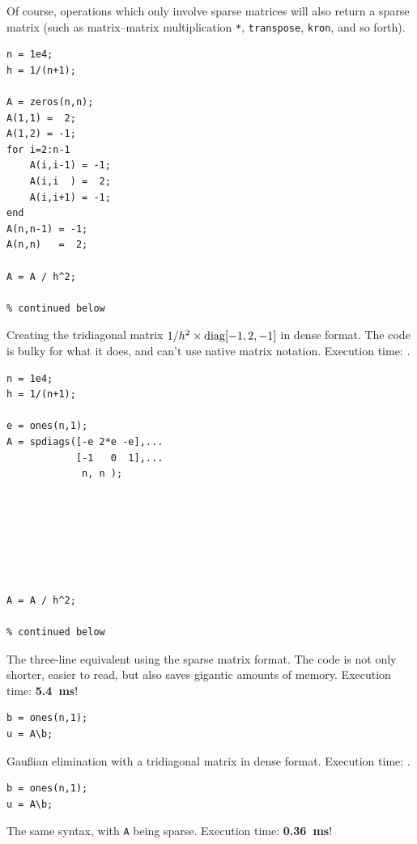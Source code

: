 
Of course, operations which only involve sparse matrices will also return a sparse matrix (such as matrix--matrix multiplication \lstinline!*!, \lstinline!transpose!, \lstinline!kron!, and so forth).



\hfill
\begin{minipage}[t]{.45\textwidth}
\begin{lstlisting}[framerule=2pt,rulecolor=\color{badred}]
n = 1e4;
h = 1/(n+1);

A = zeros(n,n);
A(1,1) =  2;
A(1,2) = -1;
for i=2:n-1
    A(i,i-1) = -1;
    A(i,i  ) =  2;
    A(i,i+1) = -1;
end
A(n,n-1) = -1;
A(n,n)   =  2;

A = A / h^2;

% continued below
\end{lstlisting}
Creating the tridiagonal matrix $1/h^2\times\operatorname{diag}[-1, 2, -1]$ in dense format. The code is bulky for what it does, and can't use native matrix notation. Execution time: .
\end{minipage}
\hfill
\begin{minipage}[t]{.45\textwidth}
\begin{lstlisting}[framerule=2pt,rulecolor=\color{goodgreen}]
n = 1e4;
h = 1/(n+1);

e = ones(n,1);
A = spdiags([-e 2*e -e],...
            [-1   0  1],...
             n, n );







A = A / h^2;

% continued below
\end{lstlisting}
The three-line equivalent using the sparse matrix format. The code is not only shorter, easier to read, but also saves gigantic amounts of memory. Execution time: \textbf{\SI{5.4}{\milli\second}}!
\end{minipage}
\hfill

\medskip

\hfill
\begin{minipage}[t]{.45\textwidth}
\begin{lstlisting}[framerule=2pt,rulecolor=\color{badred}]
% A in dense format
b = ones(n,1);
u = A\b;
\end{lstlisting}
Gau{\ss}ian elimination with a tridiagonal matrix in dense format. Execution time: .
\end{minipage}
\hfill
\begin{minipage}[t]{.45\textwidth}
\begin{lstlisting}[framerule=2pt,rulecolor=\color{goodgreen}]
% A in sparse format
b = ones(n,1);
u = A\b;
\end{lstlisting}
The same syntax, with \lstinline!A! being sparse. Execution time: \textbf{\SI{0.36}{\milli\second}}!
\end{minipage}
\hfill

